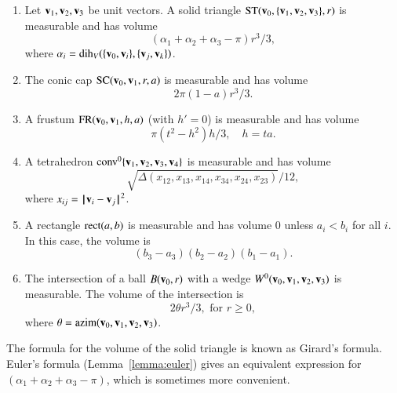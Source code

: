 \begin{lemma} 
\begin{enumerate} 
\item {} Let ${\mathbf v}_1,{\mathbf v}_2,{\mathbf v}_3$ be unit vectors.  A solid
triangle ${\operatorname{ST}}({\mathbf v}_0,\{{\mathbf v}_1,{\mathbf v}_2,{\mathbf v}_3\},r)$ is measurable and has
volume
\begin{displaymath}
(\alpha_1+\alpha_2+\alpha_3-\pi)r^3/3,
\end{displaymath}
where $\alpha_i = \operatorname{dih}_V(\{{\mathbf v}_0,{\mathbf v}_i\},\{{\mathbf v}_j,{\mathbf v}_k\})$.
\item {} The conic cap ${\operatorname{SC}}({\mathbf v}_0,{\mathbf v}_1,r,a)$ is
measurable and has volume
\begin{displaymath}
2\pi(1-a) r^3/3.
\end{displaymath}
\item {} A frustum ${\operatorname{FR}}({\mathbf v}_0,{\mathbf v}_1,h,a)$ (with $h'=0$) 
is measurable and has volume
\begin{displaymath}
\pi (t^2-h^2) h/3,\quad h = t a.
\end{displaymath}
\item{} A tetrahedron ${\operatorname{conv}}^0\{{\mathbf v}_1,{\mathbf v}_2,{\mathbf v}_3,{\mathbf v}_4\}$
is measurable and has volume
\begin{displaymath}
\sqrt{\Delta(x_{12},x_{13},x_{14},x_{34},x_{24},x_{23})}/12,
\end{displaymath}
where $x_{ij} = {\hskip0.1em|\hskip-0.15em|\hskip0.1em}{\mathbf v}_i - {\mathbf v}_j{\hskip0.1em|\hskip-0.15em|\hskip0.1em}^2$.
\item{} A rectangle ${\operatorname{rect}}(a,b)$ is measurable and
has volume $0$ unless $a_i<b_i$ for all $i$.  In this case, the
volume is
\begin{displaymath}(b_3-a_3)(b_2-a_2)(b_1-a_1).\end{displaymath}
\item{} The intersection of a ball $B({\mathbf v}_0,r)$ with a wedge
$W^0({\mathbf v}_0,{\mathbf v}_1,{\mathbf v}_2,{\mathbf v}_3)$ is measurable.  The volume of the intersection
is 
\begin{displaymath}
2 \theta r^3/3,\text{ for } r \ge 0,
\end{displaymath}
where $\theta = {\operatorname{azim}}({\mathbf v}_0,{\mathbf v}_1,{\mathbf v}_2,{\mathbf v}_3)$.

\end{enumerate}
\end{lemma}

The formula for the volume of the solid triangle is known as Girard's
formula.  Euler's formula (Lemma~\ref{lemma:euler}) gives an
equivalent expression for $(\alpha_1+\alpha_2+\alpha_3-\pi)$, which is
sometimes more convenient.  %
%

